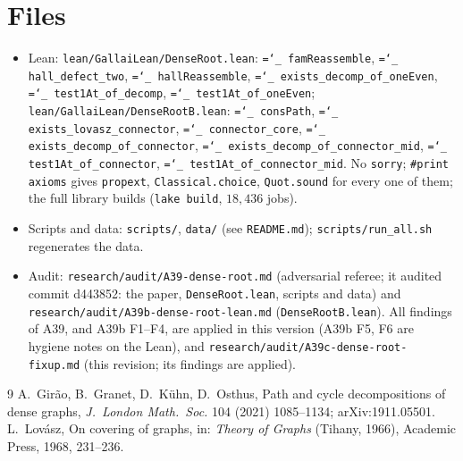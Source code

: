 \documentclass[11pt]{amsart}
\theoremstyle{definition}
\newcommand{\lean}[1]{\texttt{\hyphenchar\font=`\_ #1}}
\begin{document}
\section*{Files}
\begin{itemize}[leftmargin=*]
\item Lean: \texttt{lean/GallaiLean/DenseRoot.lean}: \lean{famReassemble}, \lean{hall\_defect\_two},
\lean{hallReassemble}, \lean{exists\_decomp\_of\_oneEven}, \lean{test1At\_of\_decomp},
\lean{test1At\_of\_oneEven}; \texttt{lean/GallaiLean/DenseRootB.lean}: \lean{consPath},
\lean{exists\_lovasz\_connector}, \lean{connector\_core}, \lean{exists\_decomp\_of\_connector},
\lean{exists\_decomp\_of\_connector\_mid}, \lean{test1At\_of\_connector},
\lean{test1At\_of\_connector\_mid}. No
\texttt{sorry}; \texttt{\#print axioms} gives \texttt{propext}, \texttt{Classical.choice},
\texttt{Quot.sound} for every one of them; the full library builds (\texttt{lake build}, $18{,}436$
jobs).
\item Scripts and data: \texttt{scripts/}, \texttt{data/} (see \texttt{README.md});
\texttt{scripts/run\_all.sh} regenerates the data.
\item Audit: \texttt{research/audit/A39-dense-root.md} (adversarial referee; it audited commit d443852:
the paper, \texttt{DenseRoot.lean}, scripts and data) and
\texttt{research/audit/A39b-dense-root-lean.md} (\texttt{DenseRootB.lean}). All findings of A39, and A39b F1--F4, are
applied in this version (A39b F5, F6 are hygiene notes on the Lean), and
\texttt{research/audit/A39c-dense-root-fixup.md} (this revision; its findings are applied).
\end{itemize}

\begin{thebibliography}{9}
 A.~Girão, B.~Granet, D.~Kühn, D.~Osthus, Path and cycle decompositions of dense graphs,
\emph{J.\ London Math.\ Soc.} 104 (2021) 1085--1134; arXiv:1911.05501.
 L.~Lov\'asz, On covering of graphs, in: \emph{Theory of Graphs} (Tihany, 1966), Academic
Press, 1968, 231--236.
\end{thebibliography}
\end{document}
